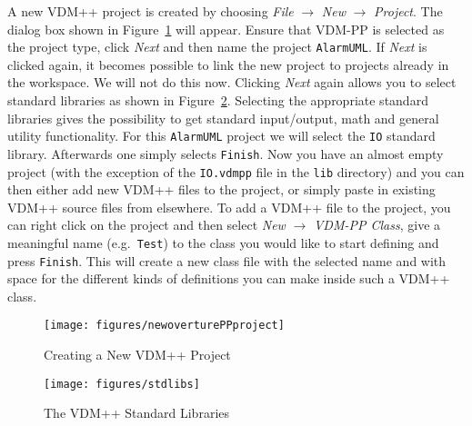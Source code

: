 A new VDM++ project is created by choosing \emph{File} $ \rightarrow$ \emph{New} $\rightarrow$ \emph{Project}. The dialog box shown in Figure~\ref{fig:newoverturePPproject} will appear. Ensure that VDM-PP is selected as the project type, click \emph{Next} and then name the project \texttt{AlarmUML}. If \emph{Next} is clicked again, it becomes possible to link the new project to projects already in the workspace.  We will not do this now.  Clicking \emph{Next} again allows you to select standard libraries as shown in Figure~\ref{fig:stdlibs}. Selecting the appropriate standard libraries gives the possibility to get standard input/output, math and general utility functionality. For this \texttt{AlarmUML} project we will select the \texttt{IO} standard library. Afterwards one simply selects \texttt{Finish}. Now you have an almost empty project (with the exception of the \texttt{IO.vdmpp} file in the \texttt{lib} directory) and you can then either add new VDM++ files to the project, or simply paste in existing VDM++ source files from elsewhere. To add a VDM++ file to the project, you can right click on the project and then select \emph{New} $\rightarrow$ \emph{VDM-PP Class}, give a meaningful name (e.g.\ \texttt{Test}) to the class you would like to start defining and press \texttt{Finish}. This will create a new class file with the selected name and with space for the different kinds of definitions you can make inside such a VDM++ class.
%
\begin{figure}[!htb]
\begin{center}
  \texttt{[image: figures/newoverturePPproject]}
  \caption[labelInTOC]{Creating a New VDM++ Project}
  \label{fig:newoverturePPproject}
\end{center}
\end{figure}
%
\begin{figure}[!htb]
\begin{center}
  \texttt{[image: figures/stdlibs]}
  \caption[labelInTOC]{The VDM++ Standard Libraries}
  \label{fig:stdlibs}
\end{center}
\end{figure}
%
